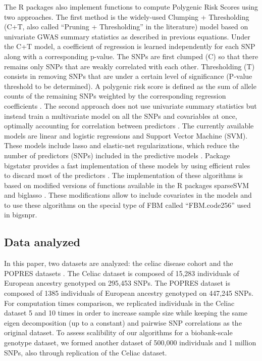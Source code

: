 \documentclass{bioinfo}
\begin{document}
\begin{methods}
The R packages also implement functions to compute Polygenic Risk Scores using two approaches. 
The first method is the widely-used Clumping + Thresholding (C+T, also called ``Pruning + Thresholding'' in the literature) model based on univariate GWAS summary statistics as described in previous equations. Under the C+T model, a coefficient of regression is learned independently for each SNP along with a corresponding p-value. The SNPs are first clumped (C) so that there remains only SNPs that are weakly correlated with each other. Thresholding (T) consists in removing SNPs that are under a certain level of significance (P-value threshold to be determined). A polygenic risk score is defined as the sum of allele counts of the remaining SNPs weighted by the corresponding regression coefficients \cite[]{Chatterjee2013,Dudbridge2013,Golan2014}. 
The second approach does not use univariate summary statistics but instead train a multivariate model on all the SNPs and covariables at once, optimally accounting for correlation between predictors \cite[]{Abraham2012}. The currently available models are linear and logistic regressions and Support Vector Machine (SVM). These models include lasso and elastic-net regularizations, which reduce the number of  predictors (SNPs) included in the predictive models \cite[]{Friedman2010,Tibshirani1996,Zou2005}. Package bigstatsr provides a fast implementation of these models by using efficient rules to discard most of the predictors \cite[]{Tibshirani2012}. The implementation of these algorithms is based on modified versions of functions available in the R packages sparseSVM and biglasso \cite[]{Zeng2017}. These modifications allow to include covariates in the models and to use these algorithms on the special type of FBM called ``FBM.code256'' used in bigsnpr.

\subsection{Data analyzed}

In this paper, two datasets are analyzed: the celiac disease cohort and the POPRES datasets \cite[]{Dubois2010,Nelson2008}. The Celiac dataset is composed of 15,283 individuals of European ancestry genotyped on 295,453 SNPs. The POPRES dataset is composed of 1385 individuals of European ancestry genotyped on 447,245 SNPs.
For computation times comparison, we replicated individuals in the Celiac dataset 5 and 10 times in order to increase sample size while keeping the same {\color{red} eigen decomposition (up to a constant) and pairwise SNP correlations} as the original dataset. To assess scalibility of our algorithms for a biobank-scale genotype dataset, we formed another dataset of 500,000 individuals and 1 million SNPs, also through replication of the Celiac dataset. \label{sec:rep}


\end{methods}
\end{document}

